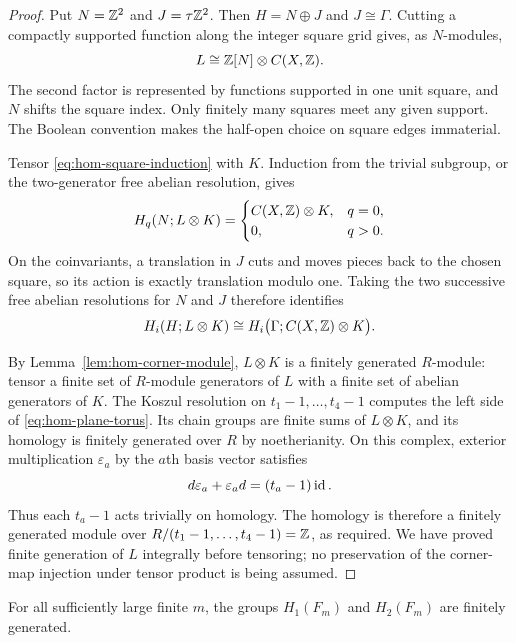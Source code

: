 \begin{proof}
Put $N=\mathbb Z^2$ and $J=\tau\mathbb Z^2$.  Then
$H=N\oplus J$ and $J\cong\Gamma$.  Cutting a compactly
supported function along the integer square grid gives, as
$N$-modules,
\begin{equation}\label{eq:hom-square-induction}
 L\cong\mathbb Z[N]\otimes C(X,\mathbb Z).
\end{equation}
The second factor is represented by functions supported in one
unit square, and $N$ shifts the square index.  Only finitely many
squares meet any given support.  The Boolean convention makes
the half-open choice on square edges immaterial.

Tensor \eqref{eq:hom-square-induction} with $K$.  Induction from
the trivial subgroup, or the two-generator free abelian
resolution, gives
\[
 H_q(N;L\otimes K)=
 \begin{cases}
 C(X,\mathbb Z)\otimes K,&q=0,\\
 0,&q>0.
 \end{cases}
\]
On the coinvariants, a translation in $J$ cuts and moves pieces
back to the chosen square, so its action is exactly translation
modulo one.  Taking the two successive free abelian resolutions
for $N$ and $J$ therefore identifies
\begin{equation}\label{eq:hom-plane-torus}
 H_i(H;L\otimes K)
   \cong H_i\bigl(\Gamma;C(X,\mathbb Z)\otimes K\bigr).
\end{equation}

By Lemma~\ref{lem:hom-corner-module}, $L\otimes K$ is a
finitely generated $R$-module: tensor a finite set of $R$-module
generators of $L$ with a finite set of abelian generators of $K$.
The Koszul resolution on $t_1-1,\ldots,t_4-1$ computes the
left side of \eqref{eq:hom-plane-torus}.  Its chain groups are
finite sums of $L\otimes K$, and its homology is finitely
generated over $R$ by noetherianity.  On this complex, exterior
multiplication $\varepsilon_a$ by the $a$th basis vector satisfies
\[
 d\varepsilon_a+\varepsilon_a d=(t_a-1)\operatorname{id}.
\]
Thus each $t_a-1$ acts trivially on homology.  The homology is
therefore a finitely generated module over
$R/(t_1-1,\ldots,t_4-1)=\mathbb Z$, as required.  We have proved
finite generation of $L$ integrally before tensoring; no
preservation of the corner-map injection under tensor product
is being assumed.
\end{proof}

\begin{proposition}\label{prop:hom-full-finiteness}
For all sufficiently large finite $m$, the groups $H_1(F_m)$
and $H_2(F_m)$ are finitely generated.
\end{proposition}

